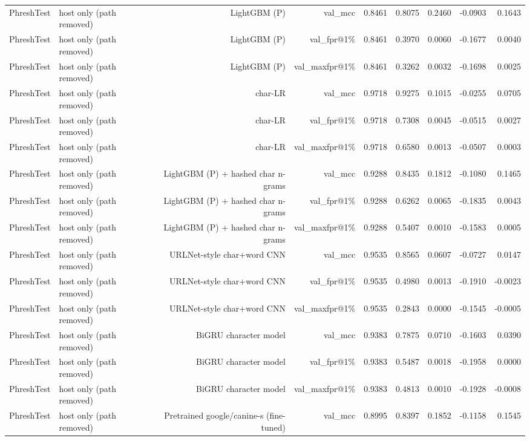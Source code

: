 \begin{table}[t]
\begin{tabular}{llrrrrrrr}
PhreshTest & host only (path removed) & LightGBM (P) & val\_mcc & 0.8461 & 0.8075 & 0.2460 & -0.0903 & 0.1643 \\
PhreshTest & host only (path removed) & LightGBM (P) & val\_fpr@1\% & 0.8461 & 0.3970 & 0.0060 & -0.1677 & 0.0040 \\
PhreshTest & host only (path removed) & LightGBM (P) & val\_maxfpr@1\% & 0.8461 & 0.3262 & 0.0032 & -0.1698 & 0.0025 \\
PhreshTest & host only (path removed) & char-LR & val\_mcc & 0.9718 & 0.9275 & 0.1015 & -0.0255 & 0.0705 \\
PhreshTest & host only (path removed) & char-LR & val\_fpr@1\% & 0.9718 & 0.7308 & 0.0045 & -0.0515 & 0.0027 \\
PhreshTest & host only (path removed) & char-LR & val\_maxfpr@1\% & 0.9718 & 0.6580 & 0.0013 & -0.0507 & 0.0003 \\
PhreshTest & host only (path removed) & LightGBM (P) + hashed char n-grams & val\_mcc & 0.9288 & 0.8435 & 0.1812 & -0.1080 & 0.1465 \\
PhreshTest & host only (path removed) & LightGBM (P) + hashed char n-grams & val\_fpr@1\% & 0.9288 & 0.6262 & 0.0065 & -0.1835 & 0.0043 \\
PhreshTest & host only (path removed) & LightGBM (P) + hashed char n-grams & val\_maxfpr@1\% & 0.9288 & 0.5407 & 0.0010 & -0.1583 & 0.0005 \\
PhreshTest & host only (path removed) & URLNet-style char+word CNN & val\_mcc & 0.9535 & 0.8565 & 0.0607 & -0.0727 & 0.0147 \\
PhreshTest & host only (path removed) & URLNet-style char+word CNN & val\_fpr@1\% & 0.9535 & 0.4980 & 0.0013 & -0.1910 & -0.0023 \\
PhreshTest & host only (path removed) & URLNet-style char+word CNN & val\_maxfpr@1\% & 0.9535 & 0.2843 & 0.0000 & -0.1545 & -0.0005 \\
PhreshTest & host only (path removed) & BiGRU character model & val\_mcc & 0.9383 & 0.7875 & 0.0710 & -0.1603 & 0.0390 \\
PhreshTest & host only (path removed) & BiGRU character model & val\_fpr@1\% & 0.9383 & 0.5487 & 0.0018 & -0.1958 & 0.0000 \\
PhreshTest & host only (path removed) & BiGRU character model & val\_maxfpr@1\% & 0.9383 & 0.4813 & 0.0010 & -0.1928 & -0.0008 \\
PhreshTest & host only (path removed) & Pretrained google/canine-s (fine-tuned) & val\_mcc & 0.8995 & 0.8397 & 0.1852 & -0.1158 & 0.1545 \\

\end{tabular}
\end{table}
